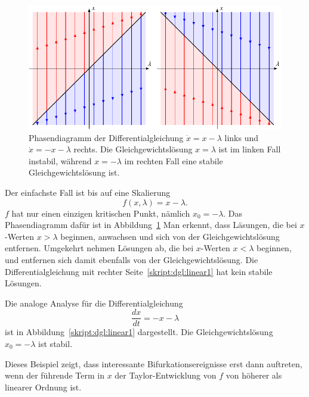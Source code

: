 \begin{beispiel}
\begin{figure}
\centering
\includegraphics{chapters/3/lin1.pdf}
\caption{
Phasendiagramm der Differentialgleichung $\dot x = x-\lambda$ links und
$\dot x = -x-\lambda$ rechts.
Die Gleichgewichtslösung $x=\lambda$ ist im linken Fall instabil,
während $x=-\lambda$ im rechten Fall eine stabile Gleichgewichtslösung ist.
\label{skript:dgl:phasen1}
}
\end{figure}%
Der einfachste Fall ist bis auf eine Skalierung
\begin{equation}
f(x,\lambda)=x-\lambda.
\label{skript:dgl:linear1}
\end{equation}
$f$ hat nur einen einzigen kritischen Punkt, nämlich $x_0=-\lambda$.
Das Phasendiagramm dafür ist in Abbildung~\ref{skript:dgl:phasen1}
Man erkennt, dass Läsungen, die bei $x$-Werten $x>\lambda$ beginnen,
anwachsen und sich von der Gleichgewichtslösung entfernen.
Umgekehrt nehmen Lösungen ab, die bei $x$-Werten $x<\lambda$ beginnen,
und entfernen sich damit ebenfalls von der Gleichgewichtslösung.
Die Differentialgleichung mit rechter Seite~\ref{skript:dgl:linear1}
hat kein stabile Lösungen.

Die analoge Analyse für die Differentialgleichung
\[
\frac{dx}{dt} = -x-\lambda
\]
ist in Abbildung~\ref{skript:dgl:linear1} dargestellt.
Die Gleichgewichtslösung $x_0=-\lambda$ ist stabil.
\end{beispiel}

Dieses Beispiel zeigt, dass interessante Bifurkationsereignisse
erst dann auftreten, wenn der führende Term in $x$ der Taylor-Entwicklung
von $f$ von höherer als linearer Ordnung ist.

